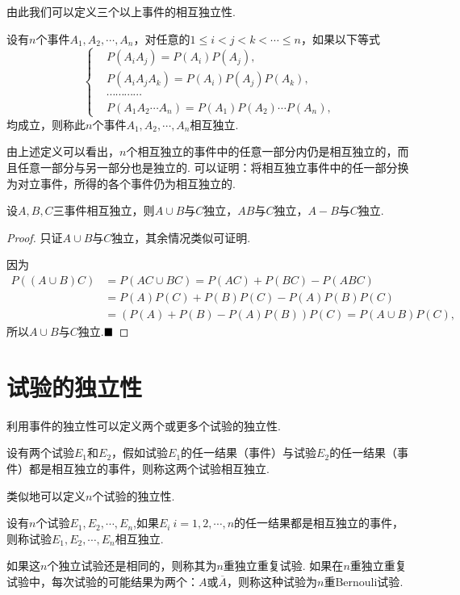 由此我们可以定义三个以上事件的相互独立性.
\begin{definition}[相互独立]
	设有$n$个事件$A_1,A_2,\cdots,A_n$，对任意的$1\leqslant i<j<k<\cdots\leqslant n$，如果以下等式
	\begin{equation}
		\left\{
		\begin{aligned}
			&P(A_iA_j)=P(A_i)P(A_j),\\
			&P(A_iA_jA_k)=P(A_i)P(A_j)P(A_k),\\
			&\cdots\cdots\cdots\cdots\\
			&P(A_1A_2\cdots A_n)=P(A_1)P(A_2)\cdots P(A_n),
		\end{aligned}
		\right.
	\end{equation}
	均成立，则称此$n$个事件$A_1,A_2,\cdots,A_n${\heiti 相互独立}.
\end{definition}
\begin{remark}
	由上述定义可以看出，$n$个相互独立的事件中的任意一部分内仍是相互独立的，而且任意一部分与另一部分也是独立的. 可以证明：将相互独立事件中的任一部分换为对立事件，所得的各个事件仍为相互独立的.
\end{remark}
\begin{proposition}
	设$A,B,C$三事件相互独立，则$A\cup B$与$C$独立，$AB$与$C$独立，$A-B$与$C$独立.
\end{proposition}
\begin{proof}
	只证$A\cup B$与$C$独立，其余情况类似可证明.
	
	因为
	\begin{align*}
		P((A\cup B)C)&=P(AC\cup BC)=P(AC)+P(BC)-P(ABC)\\
		&=P(A)P(C)+P(B)P(C)-P(A)P(B)P(C)\\
		&=(P(A)+P(B)-P(A)P(B))P(C)=P(A\cup B)P(C),
	\end{align*}
	所以$A\cup B$与$C$独立.$\hfill\blacksquare$
\end{proof}
\section{试验的独立性}
利用事件的独立性可以定义两个或更多个试验的独立性.
\begin{definition}[两个试验的独立性]
	设有两个试验$E_1$和$E_2$，假如试验$E_1$的任一结果（事件）与试验$E_2$的任一结果（事件）都是相互独立的事件，则称这两个{\heiti 试验相互独立}.
\end{definition}
类似地可以定义$n$个试验的独立性.
\begin{definition}[$n$个试验的独立性]
	设有$n$个试验$E_1,E_2,\cdots,E_n$,如果$E_i\ i=1,2,\cdots,n$的任一结果都是相互独立的事件，则称试验$E_1,E_2,\cdots,E_n${\heiti 相互独立}.
\end{definition}
\begin{remark}
	如果这$n$个独立试验还是相同的，则称其为{\heiti $n$重独立重复试验}. 如果在$n$重独立重复试验中，每次试验的可能结果为两个：$A$或$\overline{A}$，则称这种试验为{\heiti $n$重Bernouli试验}.
\end{remark}